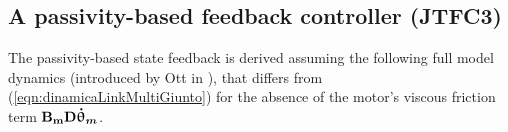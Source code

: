 \subsection{A passivity-based feedback controller (JTFC3)} \label{subsec:JTFC3}

The passivity-based state feedback is derived assuming the following full model dynamics (introduced by Ott in \cite{kugi2008passivity}), that differs from  (\ref{eqn:dinamicaLinkMultiGiunto}) for the absence of the motor's viscous friction term $\mathbf{B_m } \mathbf{D} { \boldsymbol {\dot{\uptheta}_m}} $. 


%
%
%
%
%

